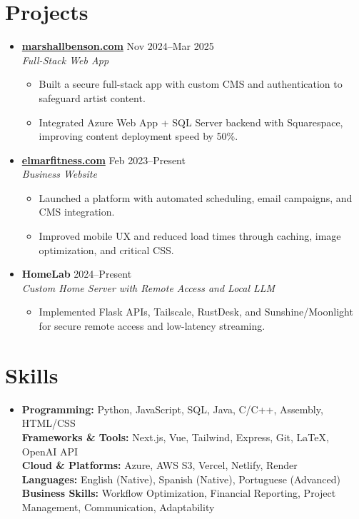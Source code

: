 \documentclass[letterpaper,10pt]{article}
\newcommand{\resumeItem}[1]{\item \small{#1}}
\begin{document}
\section*{Projects}
\begin{itemize}
  \item[]
    \textbf{\href{https://marshallbenson.com}{marshallbenson.com}} \hfill Nov 2024–Mar 2025 \\
    \textit{Full-Stack Web App}
    \begin{itemize}[leftmargin=0.15in]
      \resumeItem{Built a secure full-stack app with custom CMS and authentication to safeguard artist content.}
      \resumeItem{Integrated Azure Web App + SQL Server backend with Squarespace, improving content deployment speed by 50\%.}
    \end{itemize}

  \item[]
    \textbf{\href{https://elmarfitness.com}{elmarfitness.com}} \hfill Feb 2023–Present \\
    \textit{Business Website}
    \begin{itemize}[leftmargin=0.15in]
      \resumeItem{Launched a platform with automated scheduling, email campaigns, and CMS integration.}
      \resumeItem{Improved mobile UX and reduced load times through caching, image optimization, and critical CSS.}
    \end{itemize}

  \item[]
    \textbf{HomeLab} \hfill 2024–Present \\
    \textit{Custom Home Server with Remote Access and Local LLM}
    \begin{itemize}[leftmargin=0.15in]
      \resumeItem{Implemented Flask APIs, Tailscale, RustDesk, and Sunshine/Moonlight for secure remote access and low-latency streaming.}
    \end{itemize}
\end{itemize}

\section*{Skills}
\begin{itemize}[leftmargin=0in]
  \item[]
    \textbf{Programming:} Python, JavaScript, SQL, Java, C/C++, Assembly, HTML/CSS \\
    \textbf{Frameworks \& Tools:} Next.js, Vue, Tailwind, Express, Git, LaTeX, OpenAI API \\
    \textbf{Cloud \& Platforms:} Azure, AWS S3, Vercel, Netlify, Render \\
    \textbf{Languages:} English (Native), Spanish (Native), Portuguese (Advanced) \\
    \textbf{Business Skills:} Workflow Optimization, Financial Reporting, Project Management, Communication, Adaptability
\end{itemize}
\end{document}
